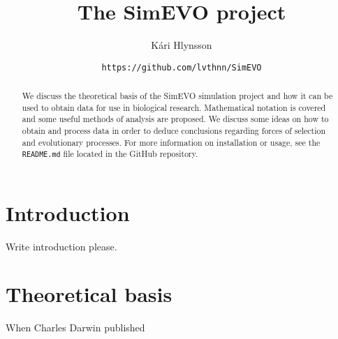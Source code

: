 \documentclass[a4paper, 12pt]{article}
\title{
    The SimEVO project
}
\author{Kári Hlynsson}
\date{\small \lstinline{https://github.com/lvthnn/SimEVO}}
\begin{document}
    \maketitle

    \begin{abstract}
        \noindent We discuss the theoretical basis of the SimEVO simulation project
        and how it can be used to obtain data for use in biological research. Mathematical
        notation is covered and some useful methods of analysis are proposed. We discuss some
        ideas on how to obtain and process data in order to deduce conclusions regarding forces of
        selection and evolutionary processes. For more information on installation or usage, see the
        \lstinline{README.md} file located in the GitHub repository.
    \end{abstract}

    \tableofcontents

    \section{Introduction}
    Write introduction please.

    \section{Theoretical basis}
    When Charles Darwin published
    
\end{document}
